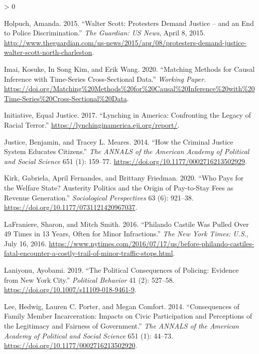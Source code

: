 \documentclass[
  12pt,
]{article}
\newlength{\cslhangindent}
\newenvironment{CSLReferences}[2] %
 {%
  \setlength{\parindent}{0pt}
  \ifodd #1 \everypar{\setlength{\hangindent}{\cslhangindent}}\ignorespaces\fi
  \ifnum #2 > 0
  \setlength{\parskip}{#2\baselineskip}
  \fi
 }%
 {}
\begin{document}
\begin{CSLReferences}{1}{0}
\leavevmode\hypertarget{ref-Holpuch2015}{}%
Holpuch, Amanda. 2015. {``Walter {Scott}: Protesters Demand Justice -- and an End to Police Discrimination.''} \emph{The Guardian: US News}, April 8, 2015. \url{http://www.theguardian.com/us-news/2015/apr/08/protesters-demand-justice-walter-scott-north-charleston}.

\leavevmode\hypertarget{ref-Imai2020}{}%
Imai, Kosuke, In Song Kim, and Erik Wang. 2020. {``Matching {Methods} for {Causal Inference} with {Time}-{Series Cross}-{Sectional Data}.''} \emph{Working Paper}. \url{https://doi.org/Matching\%20Methods\%20for\%20Causal\%20Inference\%20with\%20Time-Series\%20Cross-Sectional\%20Data}.

\leavevmode\hypertarget{ref-EqualJusticeInitiative2017}{}%
Initiative, Equal Justice. 2017. {``Lynching in {America}: {Confronting} the {Legacy} of {Racial Terror}.''} \url{https://lynchinginamerica.eji.org/report/}.

\leavevmode\hypertarget{ref-Justice2014}{}%
Justice, Benjamin, and Tracey L. Meares. 2014. {``How the {Criminal Justice System Educates Citizens}.''} \emph{The ANNALS of the American Academy of Political and Social Science} 651 (1): 159--77. \url{https://doi.org/10.1177/0002716213502929}.

\leavevmode\hypertarget{ref-Kirk2020}{}%
Kirk, Gabriela, April Fernandes, and Brittany Friedman. 2020. {``Who {Pays} for the {Welfare State}? {Austerity Politics} and the {Origin} of {Pay}-to-{Stay Fees} as {Revenue Generation}.''} \emph{Sociological Perspectives} 63 (6): 921--38. \url{https://doi.org/10.1177/0731121420967037}.

\leavevmode\hypertarget{ref-LaFraniere2016}{}%
LaFraniere, Sharon, and Mitch Smith. 2016. {``Philando {Castile Was Pulled Over} 49 {Times} in 13 {Years}, {Often} for {Minor Infractions}.''} \emph{The New York Times: U.S.}, July 16, 2016. \url{https://www.nytimes.com/2016/07/17/us/before-philando-castiles-fatal-encounter-a-costly-trail-of-minor-traffic-stops.html}.

\leavevmode\hypertarget{ref-Laniyonu2019}{}%
Laniyonu, Ayobami. 2019. {``The {Political Consequences} of {Policing}: {Evidence} from {New York City}.''} \emph{Political Behavior} 41 (2): 527--58. \url{https://doi.org/10.1007/s11109-018-9461-9}.

\leavevmode\hypertarget{ref-Lee2014}{}%
Lee, Hedwig, Lauren C. Porter, and Megan Comfort. 2014. {``Consequences of {Family Member Incarceration}: {Impacts} on {Civic Participation} and {Perceptions} of the {Legitimacy} and {Fairness} of {Government}.''} \emph{The ANNALS of the American Academy of Political and Social Science} 651 (1): 44--73. \url{https://doi.org/10.1177/0002716213502920}.


\end{CSLReferences}
\end{document}
